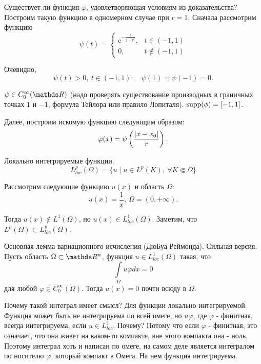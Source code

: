 \begin{note}
Существует ли функция $\varphi$, удовлетворяющая условиям из доказательства? Построим такую функцию в одномерном случае при $r = 1$. Сначала рассмотрим функцию
$$
    \psi(t) =
        \begin{cases} 
            \mathrm{e}^{-\frac{1}{1 - t^2}}, & t \in (-1, 1) \\
            0, & t \notin (-1, 1) 
        \end{cases}
$$

Очевидно, 
$$\psi(t) > 0, \ t \in (-1, 1); \quad \psi(1) = \psi(-1) = 0.$$ 

$\psi \in C_0^\infty(\real)$ (надо проверять существование производных в граничных точках $1$ и $-1$, формула Тейлора или правило Лопиталя). $\operatorname{supp}(\phi) = [-1, 1]$.

Далее, построим искомую функцию следующим образом:
$$\varphi(x) = \psi \left(\frac{\lvert x - x_0\rvert}{r}\right).$$
\end{note}

\begin{definition}{Локально интегрируемые функции.}
$$L_{loc}^p(\Omega) = \{u \mid u \in L^p(K),\ \forall K \Subset \Omega\}$$
\end{definition}

\begin{example} Рассмотрим следующие функцию $u(x)$ и область $\Omega$:
$$u(x) = \frac{1}{x},\ \Omega = (0, +\infty).$$

Тогда $u(x) \notin L^1(\Omega)$, но $u(x) \in L_{loc}^1(\Omega)$. Заметим, что $L^p(\Omega) \subset L_{loc}^p(\Omega)$.
\end{example}

\begin{lemma}{Основная лемма вариационного исчисления (ДюБуа-Реймонда). Сильная версия.}
Пусть область $\Omega \subset \real^n$, функция $u \in L_{loc}^1(\Omega)$ такая, что 
$$\int \limits_{\Omega} u \varphi dx = 0$$ 
для любой $\varphi \in C_0^\infty(\Omega)$. Тогда $u(x) = 0$ почти всюду в $\Omega$.
\end{lemma}

Почему такой интеграл имеет смысл? Для функции локально интегрируемой. Функция может быть не интегрируема по всей омеге, но $u\varphi$, где $\varphi$ - финитная, всегда интегрируема, если $u \in L_{loc}^1$. Почему? Потому что если $\varphi$ - финитная, это означает, что она живет на каком-то компакте, вне этого компакта она - ноль. Поэтому интеграл хоть и написан по омеге, на самом деле является интегралом по носителю $\varphi$, который компакт в Омега. На нем функция интегрируема.

